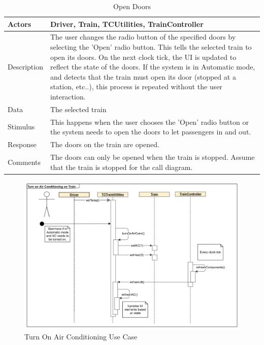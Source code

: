 \documentclass[]{article}
\begin{document}
\begin{table}[H]
	\centering
	\caption{Open Doors}
	\begin{tabular}{|l|l|}
		\hline
		Actors & \parbox[t]{10cm}{Driver, Train, TCUtilities, TrainController} \\ \hline
		Description & \parbox[t]{10cm}{The user changes the radio button of the specified doors by selecting the 'Open' radio button. This tells the selected train to open its doors. On the next clock tick, the UI is updated to reflect the state of the doors. If the system is in Automatic mode, and detects that the train must open its door (stopped at a station, etc..), this process is repeated without the user interaction.} \\ \hline
		Data &  \parbox[t]{10cm}{The selected train} \\ \hline
		Stimulus &  \parbox[t]{10cm}{ This happens when the user chooses the 'Open' radio button or the system needs to open the doors to let passengers in and out. } \\ \hline
		Response & \parbox[t]{10cm}{The doors on the train are opened. }\\ \hline
		Comments & \parbox[t]{10cm}{The doors can only be opened when the train is stopped. Assume that the train is stopped for the call diagram. }  \\ \hline
	\end{tabular}
\end{table}

\begin{figure}[H]
	\centering
	\includegraphics[scale=.5]{tc_turnOnAC_usecase}
	\caption{Turn On Air Conditioning Use Case}
\end{figure}
\end{document}
